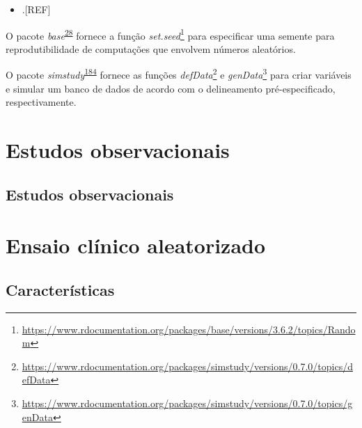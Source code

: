 \documentclass[
  a4paper,
]{book}
\providecommand{\tightlist}{%
  \setlength{\itemsep}{0pt}\setlength{\parskip}{0pt}}
\renewcommand{\href}[2]{#2\footnote{\url{#1}}}
\newenvironment{infobox}[1]
  {
  \begin{itemize}
  \renewcommand{\labelitemi}{
    \raisebox{-.7\height}[0pt][0pt]{
      {\setkeys{Gin}{width=3em,keepaspectratio}
        \texttt{[image: \#1]}}
    }
  }
  \setlength{\fboxsep}{1em}
  \begin{blackbox}
  \item
  }
  {
  \end{blackbox}
  \end{itemize}
  }
\begin{document}
\begin{itemize}
\tightlist
\item
  .{[}REF{]}
\end{itemize}

\begin{infobox}{images/Rlogo}
O pacote \emph{base}\textsuperscript{\protect\hyperlink{ref-base-5}{28}} fornece a função \href{https://www.rdocumentation.org/packages/base/versions/3.6.2/topics/Random}{\emph{set.seed}} para especificar uma semente para reprodutibilidade de computações que envolvem números aleatórios.

\end{infobox}

\begin{infobox}{images/Rlogo}
O pacote \emph{simstudy}\textsuperscript{\protect\hyperlink{ref-simstudy}{184}} fornece as funções \href{https://www.rdocumentation.org/packages/simstudy/versions/0.7.0/topics/defData}{\emph{defData}} e \href{https://www.rdocumentation.org/packages/simstudy/versions/0.7.0/topics/genData}{\emph{genData}} para criar variáveis e simular um banco de dados de acordo com o delineamento pré-especificado, respectivamente.

\end{infobox}

\hypertarget{estudos-observacionais}{%
\chapter{\texorpdfstring{\textbf{Estudos observacionais}}{Estudos observacionais}}\label{estudos-observacionais}}

\hypertarget{observacionais}{%
\section{Estudos observacionais}\label{observacionais}}

\hypertarget{ensaio-cluxednico-aleatorizado}{%
\chapter{\texorpdfstring{\textbf{Ensaio clínico aleatorizado}}{Ensaio clínico aleatorizado}}\label{ensaio-cluxednico-aleatorizado}}

\hypertarget{caracteristicas}{%
\section{Características}\label{caracteristicas}}
\end{document}
